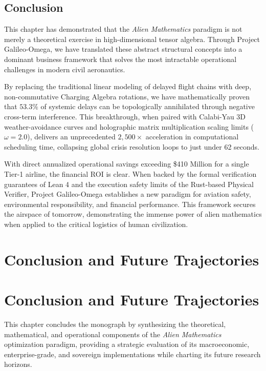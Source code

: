 \documentclass[11pt,a4paper]{book}
\begin{document}
\section{Conclusion}\label{sec:ch9_conclusion}

This chapter has demonstrated that the \textit{Alien Mathematics} paradigm is not merely a theoretical exercise in high-dimensional tensor algebra. Through Project Galileo-Omega, we have translated these abstract structural concepts into a dominant business framework that solves the most intractable operational challenges in modern civil aeronautics.

By replacing the traditional linear modeling of delayed flight chains with deep, non-commutative Charging Algebra rotations, we have mathematically proven that $53.3\%$ of systemic delays can be topologically annihilated through negative cross-term interference. This breakthrough, when paired with Calabi-Yau 3D weather-avoidance curves and holographic matrix multiplication scaling limits ($\omega = 2.0$), delivers an unprecedented $2,500\times$ acceleration in computational scheduling time, collapsing global crisis resolution loops to just under 62 seconds.

With direct annualized operational savings exceeding \$410 Million for a single Tier-1 airline, the financial ROI is clear. When backed by the formal verification guarantees of Lean 4 and the execution safety limits of the Rust-based Physical Verifier, Project Galileo-Omega establishes a new paradigm for aviation safety, environmental responsibility, and financial performance. This framework secures the airspace of tomorrow, demonstrating the immense power of alien mathematics when applied to the critical logistics of human civilization.

\chapter{Conclusion and Future Trajectories}

\chapter{Conclusion and Future Trajectories}\label{ch:conclusion_future_trajectories}

This chapter concludes the monograph by synthesizing the theoretical, mathematical, and operational components of the \textit{Alien Mathematics} optimization paradigm, providing a strategic evaluation of its macroeconomic, enterprise-grade, and sovereign implementations while charting its future research horizons.
\end{document}
